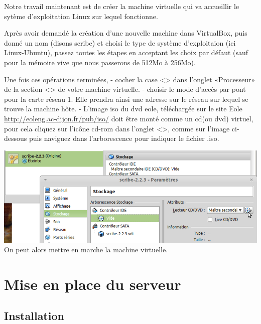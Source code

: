 \documentclass{article}
\makeatletter
\def\maxwidth{\ifdim\Gin@nat@width>\linewidth\linewidth
\else\Gin@nat@width\fi}
\let\Oldincludegraphics\includegraphics
\renewcommand{\includegraphics}[1]{\Oldincludegraphics[width=\maxwidth]{#1}}
\makeatother
\begin{document}
Notre travail maintenant est de créer la machine virtuelle qui va
accueillir le sytème d'exploitation Linux sur lequel fonctionne.

Après avoir demandé la création d'une nouvelle machine dans VirtualBox,
puis donné un nom (disons scribe) et choisi le type de système
d'exploitaion (ici Linux-Ubuntu), passez toutes les étapes en acceptant
les choix par défaut (sauf pour la mémoire vive que nous passerons de
512Mo à 256Mo).

Une fois ces opérations terminées, - cocher la case
\textless{}\textgreater{} dans l'onglet «Processeur» de la section
\textless{}\textgreater{} de votre machine virtuelle. - choisir le mode
d'accès par pont pour la carte réseau 1. Elle prendra ainsi une adresse
sur le réseau sur lequel se trouve la machine hôte. - L'image iso du dvd
eole, téléchargée sur le site Eole
\url{http://eoleng.ac-dijon.fr/pub/iso/} doit être monté comme un cd(ou
dvd) virtuel, pour cela cliquez sur l'icône cd-rom dans l'onglet
\textless{}\textgreater{}, comme sur l'image ci-dessous puis naviguez
dans l'arborescence pour indiquer le fichier .iso.

\includegraphics{scribe_html_m69a9bc5b.png}\\ On peut alors mettre en
marche la machine virtuelle.

\section{Mise en place du serveur}

\subsection{Installation}
\end{document}
